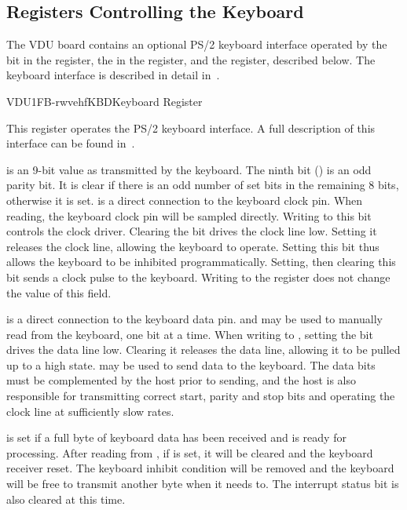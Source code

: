 \subsection{Registers Controlling the Keyboard}

The VDU board contains an optional PS/2 keyboard interface operated by the
 bit in the  register, the  in the 
register, and the  register, described below. The keyboard interface
is described in detail in~.

\begin{ioport}{VDU}{1FB}{-rwvehf}{KBD}{Keyboard Register}

  This register operates the PS/2 keyboard interface. A full description of
  this interface can be found in~.

  \begin{bitfield}
  \end{bitfield}

  \begin{description}
     is an 9-bit value as transmitted by the
    keyboard. The ninth bit () is an odd parity bit. It is clear if
    there is an odd number of set bits in the remaining 8 bits, otherwise it is
    set.   is a direct connection to the keyboard clock
    pin. When reading, the keyboard clock pin will be sampled directly. Writing
    to this bit controls the clock driver. Clearing the bit drives the clock
    line low. Setting it releases the clock line, allowing the keyboard to
    operate. Setting this bit thus allows the keyboard to be inhibited
    programmatically. Setting, then clearing this bit sends a clock pulse to
    the keyboard. Writing to the  register does not change the value
    of this field.

     is a direct connection to the keyboard data pin. 
    and  may be used to manually read from the keyboard, one bit at a
    time. When writing to , setting the bit drives the data line
    low. Clearing it releases the data line, allowing it to be pulled up to a
    high state.  may be used to send data to the keyboard. The data
    bits must be complemented by the host prior to sending, and the host is
    also responsible for transmitting correct start, parity and stop bits and
    operating the clock line at sufficiently slow rates.

     is set if a full byte of keyboard data has been received
    and is ready for processing. After reading from , if 
    is set, it will be cleared and the keyboard receiver reset. The keyboard
    inhibit condition will be removed and the keyboard will be free to transmit
    another byte when it needs to. The interrupt status bit  is
    also cleared at this time.
  \end{description}
\end{ioport}




